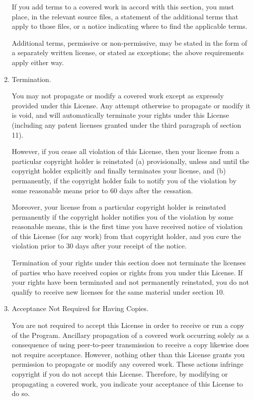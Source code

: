 \documentclass[11pt,twoside,fleqn,openright,titlepage]{cslreport}
\begin{document}
\begin{small}
\begin{enumerate}
If you add terms to a covered work in accord with this section, you
must place, in the relevant source files, a statement of the
additional terms that apply to those files, or a notice indicating
where to find the applicable terms.

Additional terms, permissive or non-permissive, may be stated in the
form of a separately written license, or stated as exceptions;
the above requirements apply either way.

\item Termination.

You may not propagate or modify a covered work except as expressly
provided under this License.  Any attempt otherwise to propagate or
modify it is void, and will automatically terminate your rights under
this License (including any patent licenses granted under the third
paragraph of section 11).

However, if you cease all violation of this License, then your
license from a particular copyright holder is reinstated (a)
provisionally, unless and until the copyright holder explicitly and
finally terminates your license, and (b) permanently, if the copyright
holder fails to notify you of the violation by some reasonable means
prior to 60 days after the cessation.

Moreover, your license from a particular copyright holder is
reinstated permanently if the copyright holder notifies you of the
violation by some reasonable means, this is the first time you have
received notice of violation of this License (for any work) from that
copyright holder, and you cure the violation prior to 30 days after
your receipt of the notice.

Termination of your rights under this section does not terminate the
licenses of parties who have received copies or rights from you under
this License.  If your rights have been terminated and not permanently
reinstated, you do not qualify to receive new licenses for the same
material under section 10.

\item Acceptance Not Required for Having Copies.

You are not required to accept this License in order to receive or
run a copy of the Program.  Ancillary propagation of a covered work
occurring solely as a consequence of using peer-to-peer transmission
to receive a copy likewise does not require acceptance.  However,
nothing other than this License grants you permission to propagate or
modify any covered work.  These actions infringe copyright if you do
not accept this License.  Therefore, by modifying or propagating a
covered work, you indicate your acceptance of this License to do so.


\end{enumerate}
\end{small}
\end{document}
